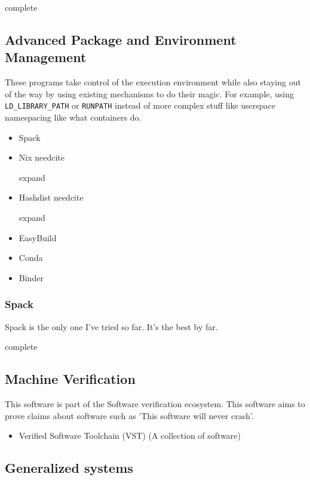 \documentclass[american]{article}
\newcommand{\complete}{
	\gls{complete}
}
\newcommand{\needcite}{
	\gls{needcite}
}
\newcommand{\expand}{
	\gls{expand}
}
\begin{document}
\complete

\subsection{Advanced Package and Environment Management} \label{sec:software-advanced}

These programs take control of the execution environment while also staying out of the way by using existing mechanisms to do their magic. For example, using \texttt{LD\_LIBRARY\_PATH} or \texttt{RUNPATH} instead of more complex stuff like userspace namespacing like what containers do.

\begin{itemize}
\item Spack \cite{Spack}
\item Nix \needcite \expand
\item Hashdist \needcite \expand
\item EasyBuild \cite{EasyBuild}
\item Conda \cite{conda}
\item Binder \cite{binder}
\end{itemize}

\subsubsection{Spack} \label{sec:spack}

Spack \cite{Spack} is the only one I've tried so far. It's the best by far.

\complete


\subsection{Machine Verification} \label{sec:software-verification}

This software is part of the Software verification ecosystem. This software aims to prove claims about software such as 'This software will never crash'.

\begin{itemize}
\item Verified Software Toolchain (VST) (A collection of software) \cite{appel-program-logics-2014}
\end{itemize}

\subsection{Generalized systems} \label{sec:software-generalized}
\end{document}
